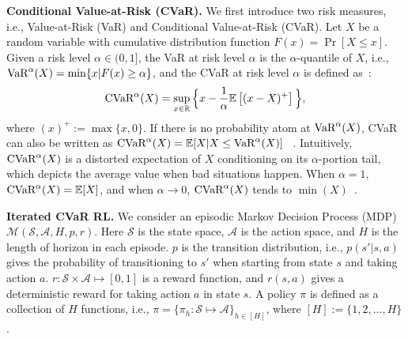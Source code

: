 \documentclass{article} %
\newcommand{\R}{\mathbb{R}}
\newcommand{\cA}{\mathcal{A}}
\newcommand{\cM}{\mathcal{M}}
\newcommand{\cS}{\mathcal{S}}
\newcommand{\ex}{\mathbb{E}}
\newcommand{\mbr}[1]{\left[ #1 \right]}
\newcommand{\cvar}{\textup{CVaR}}
\newcommand{\quantile}{\textup{VaR}}
\begin{document}
	\textbf{Conditional Value-at-Risk (CVaR).}
	We first introduce two risk measures, i.e., Value-at-Risk (VaR) and Conditional Value-at-Risk (CVaR). Let $X$ be a random variable with cumulative distribution function $F(x)=\Pr[X \leq x]$. Given a risk level $\alpha \in (0,1]$, the VaR at risk level $\alpha$ is the $\alpha$-quantile of $X$, i.e., $\quantile^{\alpha}(X)=\min\{x|F(x) \geq \alpha\}$, and the CVaR at risk level $\alpha$ is defined as~\citep{rockafellar2000optimization}:  
	\begin{align*}
		\cvar^{\alpha}(X)=\sup_{x \in \R} \Big\{ x-\frac{1}{\alpha} \ex \mbr{ (x-X)^{+} } \Big\},
	\end{align*}
	where $(x)^{+}:=\max\{x,0\}$. If there is no probability atom at $\quantile^{\alpha}(X)$, CVaR can also be written as  
	$
	\cvar^{\alpha}(X)=\ex [X|X \leq \quantile^{\alpha}(X)]
	$
	~\citep{shapiro2021lectures}.
	Intuitively, $\cvar^{\alpha}(X)$ is a distorted expectation of $X$ conditioning on its  $\alpha$-portion tail, which depicts the average value when bad situations happen. When $\alpha=1$, $\cvar^{\alpha}(X)=\ex[X]$, and when $\alpha \to 0$, $\cvar^{\alpha}(X)$ tends to $\min(X)$~\citep{chow2015risk}.
	
	
	\textbf{Iterated CVaR RL.}
	We consider an episodic Markov Decision Process (MDP) $\cM(\cS,\cA,H,p,r)$. Here $\cS$ is the state space, $\cA$ is the action space, and $H$ is the length of horizon in each episode. $p$ is the transition distribution, i.e., $p(s'|s,a)$ gives the probability of transitioning to $s'$ when starting from state $s$ and taking action $a$. $r: \cS \times \cA \mapsto [0,1]$ is a reward function, and $r(s,a)$ gives a deterministic reward for taking action $a$ in state $s$. A policy $\pi$ is defined as a collection of $H$ functions, i.e., $\pi=\{\pi_h: \cS \mapsto \cA\}_{h \in [H]}$, where $[H]:=\{1, 2, ..., H\}$. 
	
\end{document}

